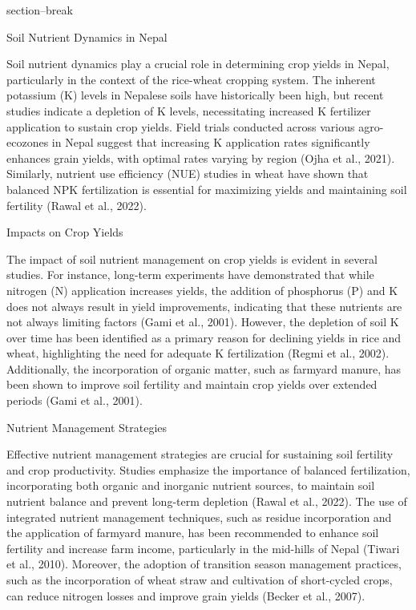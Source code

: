 \documentclass[a4paper,12pt]{article}
\begin{document}
section--break

Soil Nutrient Dynamics in Nepal

Soil nutrient dynamics play a crucial role in determining crop yields in Nepal, particularly in the context of the rice-wheat cropping system. The inherent potassium (K) levels in Nepalese soils have historically been high, but recent studies indicate a depletion of K levels, necessitating increased K fertilizer application to sustain crop yields. Field trials conducted across various agro-ecozones in Nepal suggest that increasing K application rates significantly enhances grain yields, with optimal rates varying by region (Ojha et al., 2021). Similarly, nutrient use efficiency (NUE) studies in wheat have shown that balanced NPK fertilization is essential for maximizing yields and maintaining soil fertility (Rawal et al., 2022).

Impacts on Crop Yields

The impact of soil nutrient management on crop yields is evident in several studies. For instance, long-term experiments have demonstrated that while nitrogen (N) application increases yields, the addition of phosphorus (P) and K does not always result in yield improvements, indicating that these nutrients are not always limiting factors (Gami et al., 2001). However, the depletion of soil K over time has been identified as a primary reason for declining yields in rice and wheat, highlighting the need for adequate K fertilization (Regmi et al., 2002). Additionally, the incorporation of organic matter, such as farmyard manure, has been shown to improve soil fertility and maintain crop yields over extended periods (Gami et al., 2001).

Nutrient Management Strategies

Effective nutrient management strategies are crucial for sustaining soil fertility and crop productivity. Studies emphasize the importance of balanced fertilization, incorporating both organic and inorganic nutrient sources, to maintain soil nutrient balance and prevent long-term depletion (Rawal et al., 2022). The use of integrated nutrient management techniques, such as residue incorporation and the application of farmyard manure, has been recommended to enhance soil fertility and increase farm income, particularly in the mid-hills of Nepal (Tiwari et al., 2010). Moreover, the adoption of transition season management practices, such as the incorporation of wheat straw and cultivation of short-cycled crops, can reduce nitrogen losses and improve grain yields (Becker et al., 2007).
\end{document}
